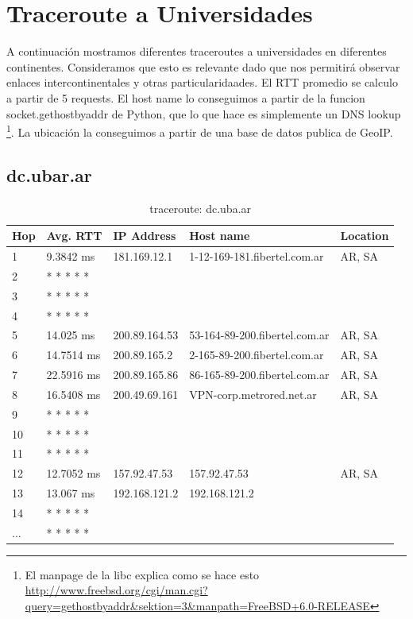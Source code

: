 \section{Traceroute a Universidades}

A continuación mostramos diferentes traceroutes a universidades en diferentes continentes. Consideramos que esto es relevante dado que nos permitirá observar enlaces intercontinentales y otras particularidaades. El RTT promedio se calculo a partir de 5 requests. El host name lo conseguimos a partir de la funcion socket.gethostbyaddr de Python, que lo que hace es simplemente un DNS lookup \footnote{El manpage de la libc explica como se hace esto \url{http://www.freebsd.org/cgi/man.cgi?query=gethostbyaddr&sektion=3&manpath=FreeBSD+6.0-RELEASE}}. La ubicación la conseguimos a partir de una base de datos publica de GeoIP.

\subsection{dc.ubar.ar}

\begin{table}[H]
\centering
\caption{traceroute: dc.uba.ar}
\begin{tabular}{@{}lllll@{}}
\toprule
Hop & Avg. RTT & IP Address & Host name & Location\\ \midrule
1 & 9.3842 ms & 181.169.12.1 & 1-12-169-181.fibertel.com.ar & AR, SA\\
2 &  * * * * * &  &  &  \\
3 &  * * * * * &  &  &  \\
4 &  * * * * * &  &  &  \\
5 & 14.025 ms & 200.89.164.53 & 53-164-89-200.fibertel.com.ar & AR, SA\\
6 & 14.7514 ms & 200.89.165.2  & 2-165-89-200.fibertel.com.ar & AR, SA\\
7 & 22.5916 ms & 200.89.165.86 & 86-165-89-200.fibertel.com.ar & AR, SA\\
8 & 16.5408 ms & 200.49.69.161 & VPN-corp.metrored.net.ar & AR, SA\\
9 &  * * * * * &  &  &  \\
10 &  * * * * * &  &  &  \\
11 &  * * * * * &  &  &  \\
12 & 12.7052 ms & 157.92.47.53 & 157.92.47.53 & AR, SA\\
13 & 13.067 ms & 192.168.121.2 & 192.168.121.2 &  \\
14 &  * * * * * &  &  &  \\
... &  * * * * * &  &  &  \\

 \bottomrule
\end{tabular}
\label{dc}
\end{table}


